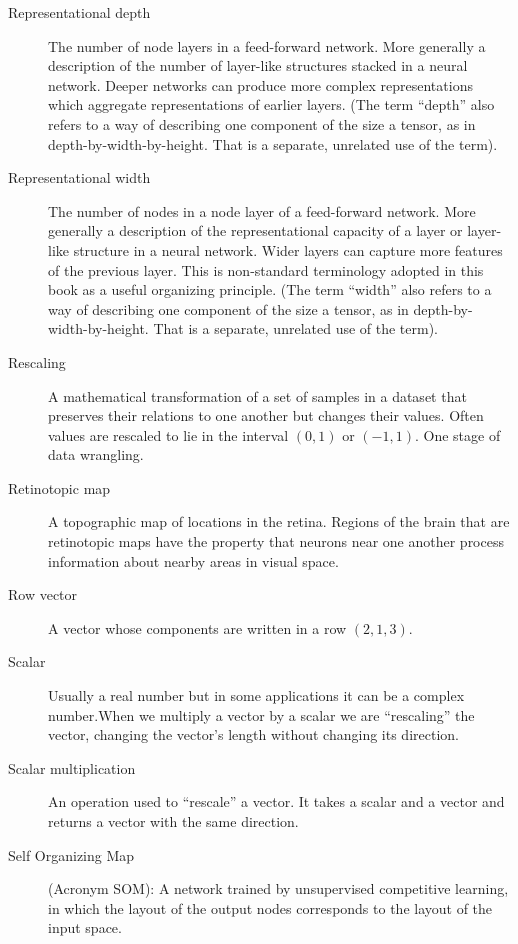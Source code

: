 \begin{description}
\item[Representational depth] The number of node layers in a feed-forward network. More generally a description of the number of  layer-like structures stacked in a neural network. Deeper networks can produce more complex representations which aggregate representations of earlier layers. (The term ``depth'' also refers to a way of describing one component of the size a tensor, as in depth-by-width-by-height. That is a separate, unrelated use of the term).
 
\item[Representational width] The number of nodes in a node layer of a feed-forward network. More generally a description of the representational capacity of a layer or layer-like structure in a neural network. Wider layers can capture more features of the previous layer. This is non-standard terminology adopted in this book as a useful organizing principle. (The term ``width'' also refers to a way of describing one component of the size a tensor, as in depth-by-width-by-height. That is a separate, unrelated use of the term).

\item[Rescaling] A mathematical transformation of a set of samples in a dataset that preserves their relations to one another but changes their values. Often values are rescaled to lie in the interval $(0,1)$ or $(-1,1)$. One stage of data wrangling.


\item[Retinotopic map] A topographic map of locations in the retina. Regions of the brain that are retinotopic maps have the property that neurons near one another process information about nearby areas in visual space.

\item[Row vector] A vector whose components are written in a row \eg $(2,1,3)$.

\item[Scalar] Usually a real number but in some applications it can be a complex number.When we multiply a vector by a scalar we are ``rescaling'' the vector, \ie changing the vector's length without changing its direction.

\item[Scalar multiplication] An operation used to ``rescale'' a vector. It takes a scalar and a vector and returns a vector with the same direction.

\item[Self Organizing Map] (Acronym SOM):  A network trained by unsupervised competitive learning, in which the layout of the output nodes corresponds to the layout of the input space.


\end{description}
